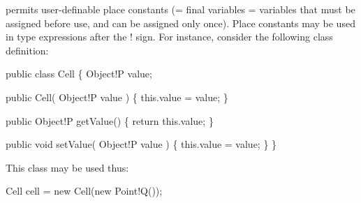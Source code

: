 \Xten{} permits user-definable place constants (= final variables =
variables that must be assigned before use, and can be assigned only
once). Place constants may be used in type expressions after the {\cf !}
sign. For instance, consider the following class definition:

\begin{x10}
 public class Cell \{
  Object!P value;

  public Cell( Object!P value ) \{  
     this.value = value;
  \}

  public Object!P getValue() \{
     return this.value;
  \}

  public void setValue( Object!P value ) \{
     this.value = value;
  \}
 \}
\end{x10}

This class may be used thus:

\begin{x10}
Cell cell = 
   new Cell(new Point!Q());
\end{x10}


